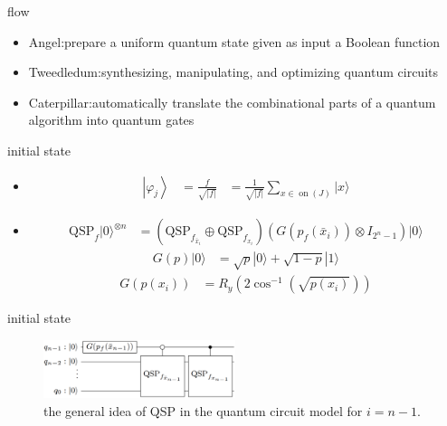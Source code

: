 \documentclass[aspectratio=1610]{beamer}
\begin{document}
\begin{frame}{flow}
  \begin{itemize}
    \item Angel:prepare a uniform quantum state
    given as input a Boolean function
    \item Tweedledum:synthesizing,
    manipulating, and optimizing quantum circuits
    \item Caterpillar:automatically translate the combinational parts of a quantum
    algorithm into quantum gates
  \end{itemize}
\end{frame}
\begin{frame}{initial state }
  \begin{itemize}
    \item \begin{align}
      \left|\varphi_{j}\right\rangle & = \frac{f}{\sqrt{|f|}} & = \frac{1}{\sqrt{|f|}} \sum_{x \in \operatorname{on}(J)}|x\rangle
      \end{align}
    \item 
    \begin{align}
      \mathrm{QSP}_{f}|0\rangle^{\otimes n} & = \left(\mathrm{QSP}_{f_{\bar{x}_{i}}} \oplus \mathrm{QSP}_{f_{x_{i}}}\right)\left(G\left(p_{f}\left(\bar{x}_{i}\right)\right) \otimes I_{2^{n}-1}\right)|0\rangle
    \end{align}
    \begin{align}
      G(p)|0\rangle & = \sqrt{p}|0\rangle+\sqrt{1-p}|1\rangle
    \end{align}
    \begin{align}
      G\left(p\left(x_{i}\right)\right) & = R_{y}\left(2 \cos ^{-1}\left(\sqrt{p\left(x_{i}\right)}\right)\right)
    \end{align}
  \end{itemize}
\end{frame}
\begin{frame}{initial state}
  \begin{figure}[htbq]
    \centering
    \includegraphics[width=0.5\textwidth]{figure/QSP.png}
    \caption{the general idea of QSP in the quantum  circuit  model for $i=n-1$.} 
    \label{fig-qsp}
  \end{figure}
\end{frame}
\end{document}
